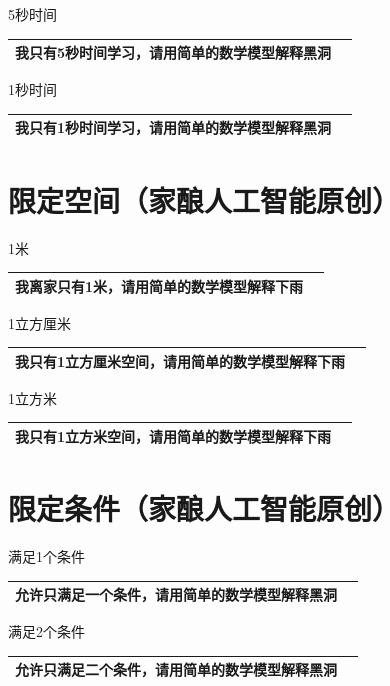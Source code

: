 \documentclass[12pt]{book}
\begin{document}
\bigskip
5秒时间

\begin{tabular}{|p{15cm}|p{3cm}|}
	\hline
我只有5秒时间学习，请用简单的数学模型解释黑洞\\
	\hline
\end{tabular}


\bigskip
1秒时间

\begin{tabular}{|p{15cm}|p{3cm}|}
	\hline
	我只有1秒时间学习，请用简单的数学模型解释黑洞\\
	\hline
\end{tabular}


\section{限定空间（家酿人工智能原创）}

\bigskip
1米

\begin{tabular}{|p{15cm}|p{3cm}|}
	\hline
  我离家只有1米，请用简单的数学模型解释下雨\\
	\hline
\end{tabular}


\bigskip
1立方厘米

\begin{tabular}{|p{15cm}|p{3cm}|}
	\hline
	我只有1立方厘米空间，请用简单的数学模型解释下雨\\
	\hline
\end{tabular}


\bigskip
1立方米

\begin{tabular}{|p{15cm}|p{3cm}|}
	\hline
我只有1立方米空间，请用简单的数学模型解释下雨\\
	\hline
\end{tabular}


\section{限定条件（家酿人工智能原创）}
\bigskip
满足1个条件

\begin{tabular}{|p{15cm}|p{3cm}|}
	\hline
允许只满足一个条件，请用简单的数学模型解释黑洞\\
	\hline
\end{tabular}

\bigskip
满足2个条件

\begin{tabular}{|p{15cm}|p{3cm}|}
	\hline
	允许只满足二个条件，请用简单的数学模型解释黑洞\\
	\hline
\end{tabular}
\end{document}
